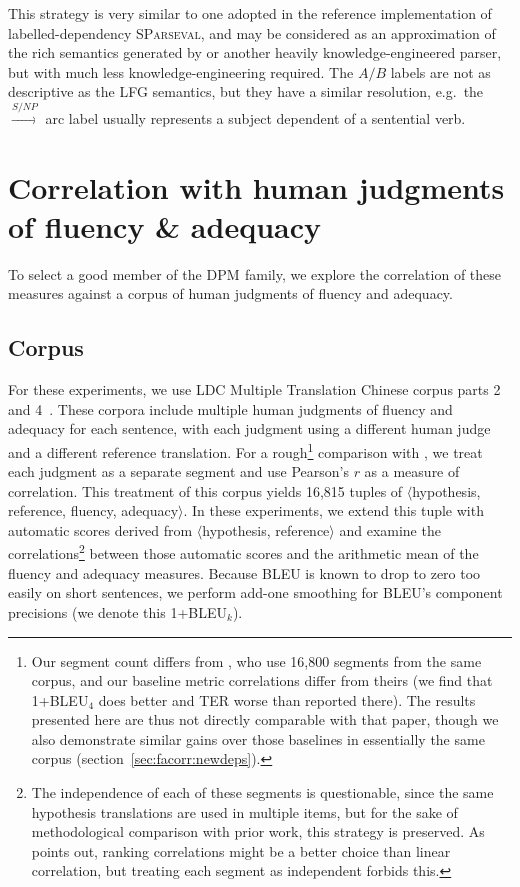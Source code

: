 \documentclass[11pt]{article}
\newcommand{\DPM}[1]{\ensuremath{\mathrm{DPM}_{#1}}}
\newcommand{\DPMempty}{\ensuremath{\DPM{}}}
\begin{document}
This strategy is very similar to one adopted in the reference
implementation of labelled-dependency \textsc{SParseval}, and may be
considered as an approximation of the rich semantics generated by
\cite{cahill04lfg} or another heavily knowledge-engineered
parser, but with much less knowledge-engineering required.
%
The $A/B$ labels are not as descriptive as the LFG semantics, but they
have a similar resolution, e.g.\ the $\stackrel{S/NP}{\to}$ arc label
usually represents a subject dependent of a sentential verb.

\section{Correlation with human judgments of fluency \& adequacy}
\label{sec:facorr}

To select a good member of the \DPMempty{} family, we explore the
correlation of these measures against a corpus of human judgments of
fluency and adequacy. 

\subsection{Corpus}

For these experiments, we use LDC Multiple Translation Chinese corpus
parts 2~\cite{LDC03MTC2} and 4~\cite{LDC06MTC4}.  These corpora
include multiple human judgments of fluency and adequacy for each
sentence, with each judgment using a different human judge and a
different reference translation.  For a rough\footnote{Our segment
  count differs from , who use
  16,800 segments from the same corpus, and our baseline metric
  correlations differ from theirs (we find that 1+BLEU$_4$ does better
  and TER worse than reported there).
  The results presented here are thus not directly comparable with that
  paper, though we also demonstrate similar gains over those baselines in
  essentially the same corpus (section~\ref{sec:facorr:newdeps}).}
comparison with , we treat each
judgment as a separate segment and use Pearson's $r$ as a measure of
correlation.
%
This treatment of this corpus yields 16,815 tuples of
$\langle$hypothesis, reference, fluency, adequacy$\rangle$.  In these
experiments, we extend this tuple with automatic scores derived from
$\langle$hypothesis, reference$\rangle$ and examine the
correlations\footnote{The independence of each of these segments is
  questionable, since the same hypothesis translations are used in
  multiple items, but for the sake of methodological comparison with
  prior work, this strategy is preserved. As 
  points out, ranking correlations might be a better choice than
  linear correlation, but treating each segment as independent forbids
  this.}  between those automatic scores and the arithmetic mean of
the fluency and adequacy measures.  Because BLEU is known to drop
to zero too easily on short sentences, we perform add-one smoothing for
BLEU's component precisions (we denote this 1+BLEU$_k$).
\end{document}
